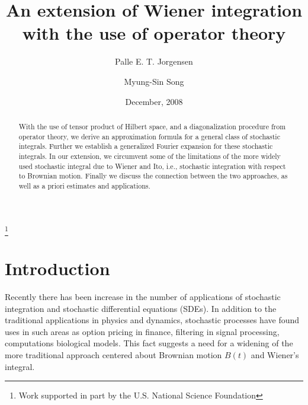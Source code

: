 \documentclass{amsart}
\theoremstyle{definition}
\theoremstyle{remark}
\numberwithin{equation}{section}
\begin{document}
\title[An extension of Wiener integration with the use of operator theory]{An extension of Wiener integration with the use of operator theory}

\author{Palle E. T. Jorgensen}
\address{Department of Mathematics, The University of Iowa, Iowa City, IA52242, USA}
\curraddr{}
\thanks{Work supported in part by the U.S. National Science Foundation}

\author{Myung-Sin Song}
\address{Department of Mathematics and Statistics, Southern Illinois University Edwardsville, Edwardsville, IL62026, USA}
\curraddr{}

\date{December, 2008}


\begin{abstract}
With the use of tensor product of Hilbert space, and a diagonalization 
procedure from operator theory, we derive an approximation formula for a 
general class of stochastic integrals. Further we establish a generalized 
Fourier expansion for these stochastic integrals. In our extension, we 
circumvent some of the limitations of the more widely used stochastic 
integral due to Wiener and Ito, i.e., stochastic integration with respect 
to Brownian motion. Finally we discuss the connection between the two 
approaches, as well as a priori estimates and applications.
\end{abstract}

\maketitle \tableofcontents

\section{Introduction}
\label{sec:1}

Recently there has been increase in the number of applications of 
stochastic integration and stochastic differential equations (SDEs). In 
addition to the traditional applications in physics and dynamics, stochastic 
processes have found uses  in such areas as option pricing in finance, 
filtering in signal processing, computations biological models. This fact 
suggests a need for a widening of the more traditional approach centered 
about Brownian motion $B(t)$ and Wiener's integral.
\end{document}
